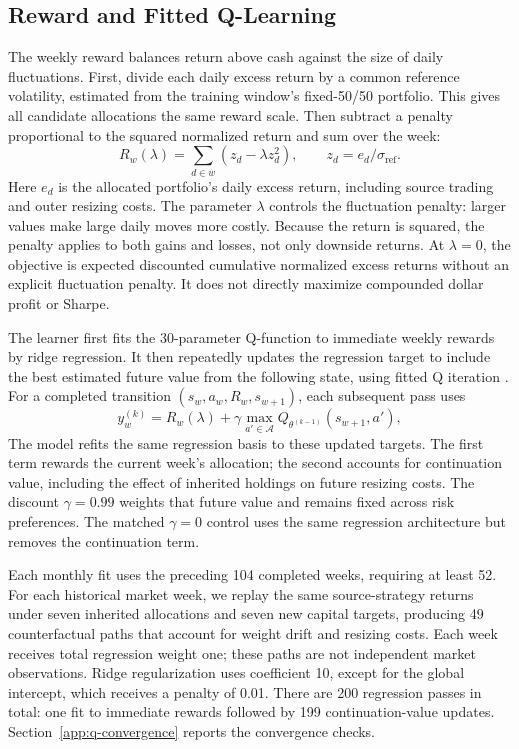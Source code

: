 \subsection{Reward and Fitted Q-Learning}

The weekly reward balances return above cash against the size of daily fluctuations. First, divide each daily excess return by a common reference volatility, estimated from the training window's fixed-50/50 portfolio. This gives all candidate allocations the same reward scale. Then subtract a penalty proportional to the squared normalized return and sum over the week:
\begin{equation*}
R_w(\lambda)=\sum_{d\in w}(z_d-\lambda z_d^2),\qquad
z_d=e_d/\widehat{\sigma}_{\mathrm{ref}}.
\end{equation*}
Here \(e_d\) is the allocated portfolio's daily excess return, including source trading and outer resizing costs. The parameter \(\lambda\) controls the fluctuation penalty: larger values make large daily moves more costly. Because the return is squared, the penalty applies to both gains and losses, not only downside returns. At \(\lambda=0\), the objective is expected discounted cumulative normalized excess returns without an explicit fluctuation penalty. It does not directly maximize compounded dollar profit or Sharpe.

The learner first fits the 30-parameter Q-function to immediate weekly rewards by ridge regression. It then repeatedly updates the regression target to include the best estimated future value from the following state, using fitted Q iteration \cite{ernst2005}. For a completed transition \((s_w,a_w,R_w,s_{w+1})\), each subsequent pass uses
\begin{equation*}
y_w^{(k)}=R_w(\lambda)+\gamma\max_{a'\in\mathcal A}
Q_{\theta^{(k-1)}}(s_{w+1},a'),
\end{equation*}
The model refits the same regression basis to these updated targets. The first term rewards the current week's allocation; the second accounts for continuation value, including the effect of inherited holdings on future resizing costs. The discount \(\gamma=0.99\) weights that future value and remains fixed across risk preferences. The matched \(\gamma=0\) control uses the same regression architecture but removes the continuation term.

Each monthly fit uses the preceding 104 completed weeks, requiring at least 52. For each historical market week, we replay the same source-strategy returns under seven inherited allocations and seven new capital targets, producing 49 counterfactual paths that account for weight drift and resizing costs. Each week receives total regression weight one; these paths are not independent market observations. Ridge regularization uses coefficient 10, except for the global intercept, which receives a penalty of 0.01. There are 200 regression passes in total: one fit to immediate rewards followed by 199 continuation-value updates. Section~\ref{app:q-convergence} reports the convergence checks.

